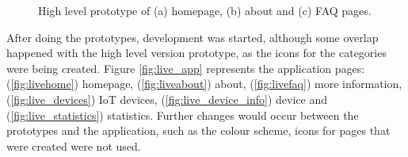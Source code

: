 \begin{figure}[H]
\begin{subfigure}{0.33\textwidth}
        \caption{}
        \label{fig:highfaq}
    \end{subfigure}%
    \caption{High level prototype of (a) homepage, (b) about and (c) FAQ pages.}
    \label{fig:highlevelprototype}
\end{figure}

After doing the prototypes, development was started, although some overlap
happened with the high level version prototype, as the icons for the categories
were being created. Figure \ref{fig:live_app} represents the application pages:
(\ref{fig:livehome}) homepage, (\ref{fig:liveabout}) about, (\ref{fig:livefaq}) more
information, (\ref{fig:live_devices}) IoT devices, (\ref{fig:live_device_info}) device
and (\ref{fig:live_statistics}) statistics.
Further changes would occur between the prototypes and
the application, such as the colour scheme, icons for pages that were created
were not used.


